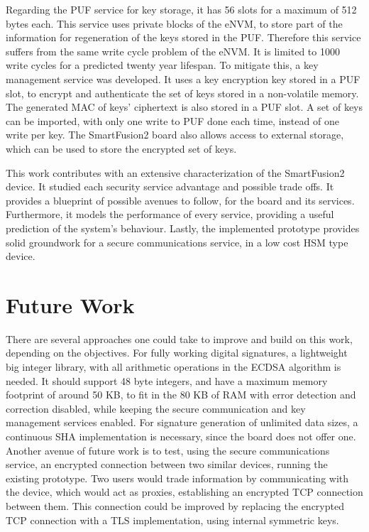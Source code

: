 Regarding the PUF service for key storage, it has 56 slots for a maximum of 512 bytes each. This service uses private blocks of the eNVM, to store part of the information for regeneration of the keys stored in the PUF. Therefore this service suffers from the same write cycle problem of the eNVM. It is limited to 1000 write cycles for a predicted twenty year lifespan. To mitigate this, a key management service was developed. It uses a key encryption key stored in a PUF slot, to encrypt and authenticate the set of keys stored in a non-volatile memory. The generated MAC of keys' ciphertext is also stored in a PUF slot. A set of keys can be imported, with only one write to PUF done each time, instead of one write per key. The SmartFusion2 board also allows access to external storage, which can be used to store the encrypted set of keys.

This work contributes with an extensive characterization of the SmartFusion2 device. It studied each security service advantage and possible trade offs. It provides a blueprint of possible avenues to follow, for the board and its services. Furthermore, it models the performance of every service, providing a useful prediction of the system's behaviour. Lastly, the implemented prototype provides solid groundwork for a secure communications service, in a low cost HSM type device.

\section{Future Work} \label{chap:conclusion:future-work}

There are several approaches one could take to improve and build on this work, depending on the objectives. For fully working digital signatures, a lightweight big integer library, with all arithmetic operations in the ECDSA algorithm is needed. It should support 48 byte integers, and have a maximum memory footprint of around 50 KB, to fit in the 80 KB of RAM with error detection and correction disabled, while keeping the secure communication and key management services enabled. For signature generation of unlimited data sizes, a continuous SHA implementation is necessary, since the board does not offer one.
Another avenue of future work is to test, using the secure communications service, an encrypted connection between two similar devices, running the existing prototype. Two users would trade information by communicating with the device, which would act as proxies, establishing an encrypted TCP connection between them. This connection could be improved by replacing the encrypted TCP connection with a TLS implementation, using internal symmetric keys.
